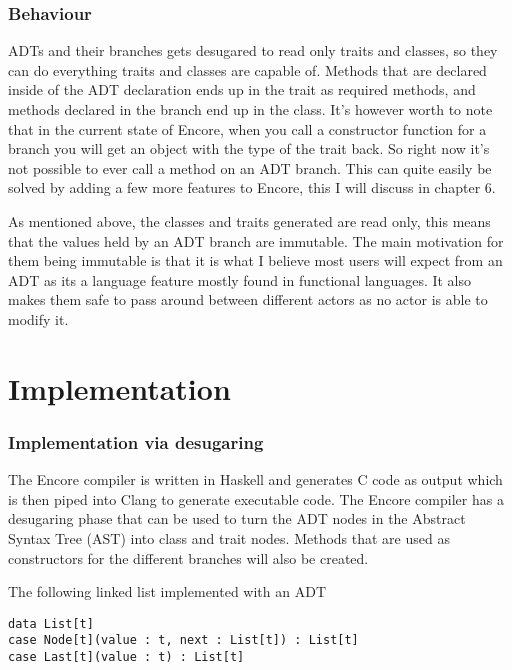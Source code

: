 \documentclass[10pt]{report}
\begin{document}
{\subsection{Behaviour}
\par{ADTs and their branches gets desugared to read only traits and classes, so they can do everything traits and classes are capable of.  Methods that are declared inside of the ADT declaration ends up in the trait as required methods, and methods declared in the branch end up in the class. It's however worth to note that in the current state of Encore, when you call a constructor function for a branch you will get an object with the type of the trait back. So right now it's not possible to ever call a method on an ADT branch. This can quite easily be solved by adding a few more features to Encore, this I will discuss in chapter 6.}
\par{As mentioned above, the classes and traits generated are read only, this means that the values held by an ADT branch are immutable.  The main motivation for them being immutable is that it is what I believe most users will expect from an ADT as its a language feature mostly found in functional languages. It also makes them safe to pass around between different actors as no actor is able to modify it.}
\chapter{Implementation}

\subsection{Implementation via desugaring}
\par{The Encore compiler is written in Haskell and generates C code as output which is then piped into Clang to generate executable code. The Encore compiler has a desugaring phase that can be used to turn the ADT nodes in the Abstract Syntax Tree (AST) into class and trait nodes. Methods that are used as constructors for the different branches will also be created.}
\par{The following linked list implemented with an ADT}

\begin{lstlisting}[language=encore,caption={Linked list before it has been desugared}]
data List[t]
case Node[t](value : t, next : List[t]) : List[t]
case Last[t](value : t) : List[t]
\end{lstlisting}

}
\end{document}
